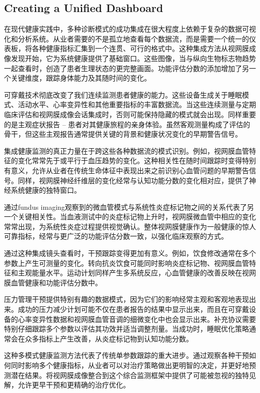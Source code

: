 \documentclass[
  Letterpaper,
]{scrbook}
\begin{document}
\subsection{Creating a Unified
Dashboard}\label{creating-a-unified-dashboard}

在现代健康实践中，多种诊断模式的成功集成在很大程度上依赖于复杂的数据可视化和分析系统。从业者需要的不是孤立地查看每个数据流，而是需要一个统一的仪表板，将各种健康指标汇集到一个连贯、可行的格式中。这种集成方法从视网膜成像发现开始，它为系统健康提供了基础窗口。这些图像，当与纵向生物标志物趋势一起查看时，创造了患者生理状态的更完整画面。功能评估分数的添加增加了另一个关键维度，跟踪身体能力及其随时间的变化。

可穿戴技术彻底改变了我们连续监测患者健康的能力。这些设备生成关于睡眠模式、活动水平、心率变异性和其他重要指标的丰富数据流。当这些连续测量与定期临床评估和视网膜成像会话集成时，否则可能保持隐藏的模式就会出现。同样重要的是主观症状报告
--
患者对其健康旅程的亲身体验。虽然客观测量构成了评估的骨干，但这些主观报告通常提供关键的背景和健康状况变化的早期警告信号。

集成健康监测的真正力量在于跨这些各种数据流的模式识别。例如，视网膜血管特征的变化常常先于或平行于血压趋势的变化。这种相关性在随时间跟踪时变得特别有意义，允许从业者在传统生命体征中表现出来之前识别心血管问题的早期警告信号。同样，视网膜神经纤维层的变化经常与认知功能分数的变化相对应，提供了神经系统健康的独特窗口。

通过fundus
imaging观察到的微血管模式与系统性炎症标记物之间的关系代表了另一个关键相关性。当血液测试中的炎症标记物上升时，视网膜微血管中相应的变化常常出现，为系统性炎症过程提供视觉确认。整体视网膜健康作为一般健康的惊人可靠指标，经常与更广泛的功能评估分数一致，以强化临床观察的方式。

通过这种集成镜头查看时，干预跟踪变得更加有意义。例如，饮食修改通常在多个参数上产生可测量的变化。转向抗炎饮食可能同时影响炎症标记物、视网膜血管特征和主观能量水平。运动计划同样产生多系统反应，心血管健康的改善反映在视网膜血管健康和功能评估分数中。

压力管理干预提供特别有趣的数据模式，因为它们的影响经常主观和客观地表现出来。成功的压力减少计划可能不仅在患者报告的结果中显示出来，而且在可穿戴设备的心率变异性数据和视网膜血管音调的细微变化中也会显示出来。补充协议需要特别仔细跟踪多个参数以评估其功效并适当调整剂量。当成功时，睡眠优化策略通常会在众多指标上产生改善，从炎症标记物到认知功能分数。

这种多模式健康监测方法代表了传统单参数跟踪的重大进步。通过观察各种干预如何同时影响多个健康指标，从业者可以对治疗策略做出更明智的决定，并更好地预测潜在结果。将视网膜成像整合到这个综合监测框架中提供了可能被忽视的独特见解，允许更早干预和更精确的治疗优化。
\end{document}
